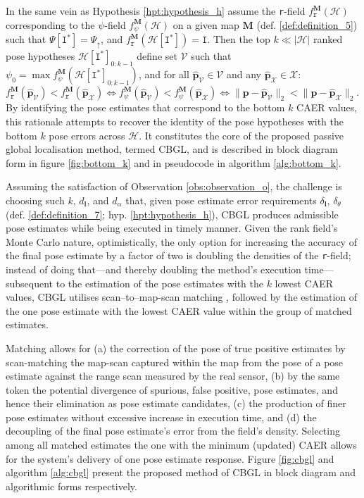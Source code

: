 In the same vein as Hypothesis \ref{hpt:hypothesis_h} assume the \texttt{r}-field
$f_{\texttt{r}}^{\bm{M}}(\mathcal{H})$ corresponding to the $\psi$-field
$f_{\psi}^{\bm{M}}(\mathcal{H})$ on a given map $\bm{M}$ (def.
\ref{def:definition_5}) such that $\Psi[\texttt{I}^{\ast}] = \Psi_\uparrow$,
and $f_{\texttt{r}}^{\bm{M}}(\mathcal{H}[\texttt{I}^{\ast}]) = \texttt{I}$.
Then the top $k \ll |\mathcal{H}|$ ranked pose hypotheses
$\mathcal{H}[\texttt{I}^{\ast}]_{0:k-1}$ define set $\mathcal{V}$ such that
$\psi_0 = \max f_{\psi}^{\bm{M}}(\mathcal{H}[\texttt{I}^{\ast}]_{0:k-1})$,
and for all $\hat{\bm{p}}_\mathcal{V} \in \mathcal{V}$
and any $\hat{\bm{p}}_{\mathcal{X}} \in \mathcal{X}$:
$ f_{\texttt{r}}^{\bm{M}}(\hat{\bm{p}}_\mathcal{V}) < f_{\texttt{r}}^{\bm{M}}(\hat{\bm{p}}_{\mathcal{X}}) \Leftrightarrow
f_{\psi}^{\bm{M}}(\hat{\bm{p}}_\mathcal{V}) < f_{\psi}^{\bm{M}}(\hat{\bm{p}}_\mathcal{X}) \Leftrightarrow
\|\bm{p}-\hat{\bm{p}}_\mathcal{V}\|_2 < \|\bm{p}-\hat{\bm{p}}_{\mathcal{X}}\|_2$.
By identifying the pose estimates that correspond to the bottom $k$ CAER
values, this rationale attempts to recover the identity of the pose hypotheses
with the bottom $k$ pose errors across $\mathcal{H}$. It constitutes the core
of the proposed passive global localisation method, termed CBGL, and is
described in block diagram form in figure \ref{fig:bottom_k} and in pseudocode
in algorithm \ref{alg:bottom_k}.

Assuming the satisfaction of Observation \ref{obs:observation_o}, the challenge
is choosing such $k$, $d_{\bm{l}}$, and $d_\alpha$ that, given pose estimate
error requirements $\delta_{\bm{l}}$, $\delta_{\theta}$ (def.
\ref{def:definition_7}; hyp.  \ref{hpt:hypothesis_h}), CBGL produces admissible
pose estimates while being executed in timely manner.  Given the rank field's
Monte Carlo nature, optimistically, the only option for increasing the accuracy
of the final pose estimate by a factor of two is doubling the densities of the
\texttt{r}-field; instead of doing that---and thereby doubling the method's
execution time---subsequent to the estimation of the pose estimates with the
$k$ lowest CAER values, CBGL utilises scan--to--map-scan matching
\cite{Vasiljevic2016c,Filotheou2023a}, followed by the estimation of the one
pose estimate with the lowest CAER value within the group of matched estimates.

Matching allows for (a) the correction of the pose of true positive estimates
by scan-matching the map-scan captured within the map from the pose of a pose
estimate against the range scan measured by the real sensor, (b) by the same
token the potential divergence of spurious, false positive, pose estimates, and
hence their elimination as pose estimate candidates, (c) the production of
finer pose estimates without excessive increase in execution time, and (d) the
decoupling of the final pose estimate's error from the field's density.
Selecting among all matched estimates the one with the minimum (updated) CAER
allows for the system's delivery of one pose estimate response.  Figure
\ref{fig:cbgl} and algorithm \ref{alg:cbgl} present the proposed method of CBGL
in block diagram and algorithmic forms respectively.

